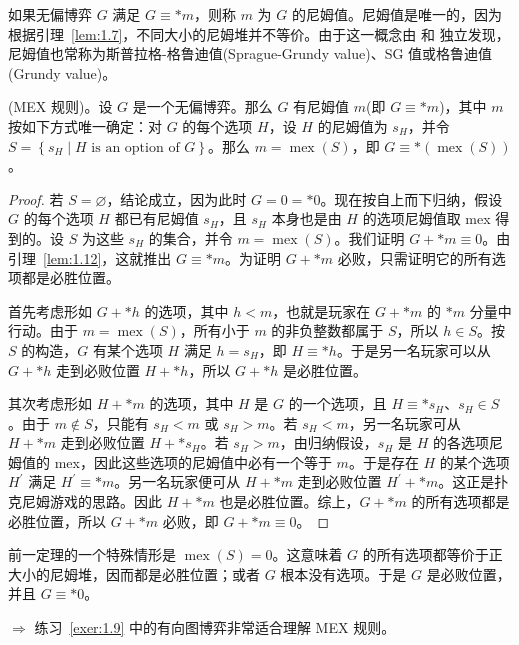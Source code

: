 如果无偏博弈 \(G\) 满足 \(G\equiv *m\)，则称 \(m\) 为 \(G\) 的尼姆值。尼姆值是唯一的，因为根据引理~\ref{lem:1.7}，不同大小的尼姆堆并不等价。由于这一概念由 \citet{sprague1935} 和 \citet{grundy1939} 独立发现，尼姆值也常称为斯普拉格-格鲁迪值(Sprague-Grundy value)、SG 值或格鲁迪值(Grundy value)。
\begin{theorem}\label{theo:1.14}(MEX 规则)。设 \(G\) 是一个无偏博弈。那么 \(G\) 有尼姆值 \(m\)(即 \(G\equiv *m\))，其中 \(m\) 按如下方式唯一确定：对 \(G\) 的每个选项 \(H\)，设 \(H\) 的尼姆值为 \({s}_{H}\)，并令 \(S=\left\{{s}_{H}\mid H\text{ is an option of }G\right\}\)。那么 \(m=\operatorname{mex}(S)\)，即 \(G\equiv *\left({\operatorname{mex}(S)}\right)\)。
\end{theorem}
\begin{proof}
若 \(S=\varnothing\)，结论成立，因为此时 \(G=0=*0\)。现在按自上而下归纳，假设 \(G\) 的每个选项 \(H\) 都已有尼姆值 \({s}_{H}\)，且 \({s}_{H}\) 本身也是由 \(H\) 的选项尼姆值取 mex 得到的。设 \(S\) 为这些 \({s}_{H}\) 的集合，并令 \(m=\operatorname{mex}(S)\)。我们证明 \(G+*m\equiv 0\)。由引理~\ref{lem:1.12}，这就推出 \(G\equiv *m\)。为证明 \(G+*m\) 必败，只需证明它的所有选项都是必胜位置。

首先考虑形如 \(G+*h\) 的选项，其中 \(h<m\)，也就是玩家在 \(G+*m\) 的 \(*m\) 分量中行动。由于 \(m=\operatorname{mex}(S)\)，所有小于 \(m\) 的非负整数都属于 \(S\)，所以 \(h\in S\)。按 \(S\) 的构造，\(G\) 有某个选项 \(H\) 满足 \(h={s}_{H}\)，即 \(H\equiv *h\)。于是另一名玩家可以从 \(G+*h\) 走到必败位置 \(H+*h\)，所以 \(G+*h\) 是必胜位置。

其次考虑形如 \(H+*m\) 的选项，其中 \(H\) 是 \(G\) 的一个选项，且 \(H\equiv *{s}_{H}\)、\({s}_{H}\in S\)。由于 \(m\notin S\)，只能有 \({s}_{H}<m\) 或 \({s}_{H}>m\)。若 \({s}_{H}<m\)，另一名玩家可从 \(H+*m\) 走到必败位置 \(H+*{s}_{H}\)。若 \({s}_{H}>m\)，由归纳假设，\({s}_{H}\) 是 \(H\) 的各选项尼姆值的 mex，因此这些选项的尼姆值中必有一个等于 \(m\)。于是存在 \(H\) 的某个选项 \({H}^{\prime}\) 满足 \({H}^{\prime}\equiv *m\)。另一名玩家便可从 \(H+*m\) 走到必败位置 \({H}^{\prime}+*m\)。这正是扑克尼姆游戏的思路。因此 \(H+*m\) 也是必胜位置。综上，\(G+*m\) 的所有选项都是必胜位置，所以 \(G+*m\) 必败，即 \(G+*m\equiv 0\)。

\end{proof}

前一定理的一个特殊情形是 \(\operatorname{mex}(S)=0\)。这意味着 \(G\) 的所有选项都等价于正大小的尼姆堆，因而都是必胜位置；或者 \(G\) 根本没有选项。于是 \(G\) 是必败位置，并且 \(G\equiv *0\)。

\(\Rightarrow\) 练习~\ref{exer:1.9} 中的有向图博弈非常适合理解 MEX 规则。

